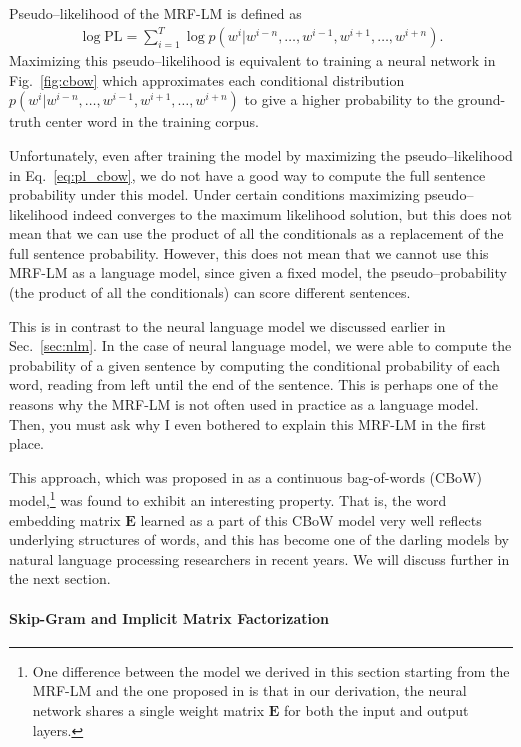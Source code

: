 \documentclass{report}
\newcommand{\matr}[1]{\mathbf{#1}}
\newcommand{\mE}[0]{\matr{E}}
\newcommand{\PL}{\text{PL}}
\begin{document}
Pseudo--likelihood of the MRF-LM is defined as
\begin{align}
    \label{eq:pl_cbow}
    \log \PL = \sum_{i=1}^T \log p(w^i | w^{i-n}, \ldots, w^{i-1}, w^{i+1}, \ldots,
    w^{i+n}).
\end{align}
Maximizing this pseudo--likelihood is equivalent to training a neural network in
Fig.~\ref{fig:cbow} which approximates each conditional distribution $p(w^i |
w^{i-n}, \ldots, w^{i-1}, w^{i+1}, \ldots, w^{i+n})$ to give a higher
probability to the ground-truth center word in the training corpus.

Unfortunately, even after training the model by maximizing the pseudo--likelihood
in Eq.~\eqref{eq:pl_cbow}, we do not have a good way to compute the full
sentence probability under this model. Under certain conditions maximizing
pseudo--likelihood indeed converges to the maximum likelihood solution, but this
does not mean that we can use the product of all the conditionals as a
replacement of the full sentence probability. However, this does not mean that
we cannot use this MRF-LM as a language model, since given a fixed model, the
pseudo--probability (the product of all the conditionals) can score different
sentences. 

This is in contrast to the neural language model we discussed earlier in
Sec.~\ref{sec:nlm}. In the case of neural language model, we were able to
compute the probability of a given sentence by computing the conditional
probability of each word, reading from left until the end of the sentence. This
is perhaps one of the reasons why the MRF-LM is not often used in practice as a
language model. Then, you must ask why I even bothered to explain this MRF-LM in
the first place.

This approach, which was proposed in \citet{mikolov2013efficient} as a
continuous bag-of-words (CBoW) model,\footnote{
    One difference between the model we derived in this section starting from
    the MRF-LM and the one proposed in \citet{mikolov2013efficient} is that in
    our derivation, the neural network shares a single weight matrix $\mE$ for
    both the input and output layers.
} was found to exhibit an interesting property. That is, the word embedding
matrix $\mE$ learned as a part of this CBoW model very well reflects underlying
structures of words, and this has become one of the darling models by natural
language processing researchers in recent years. We will discuss further in the
next section.

\paragraph{Skip-Gram and Implicit Matrix Factorization}
\end{document}
